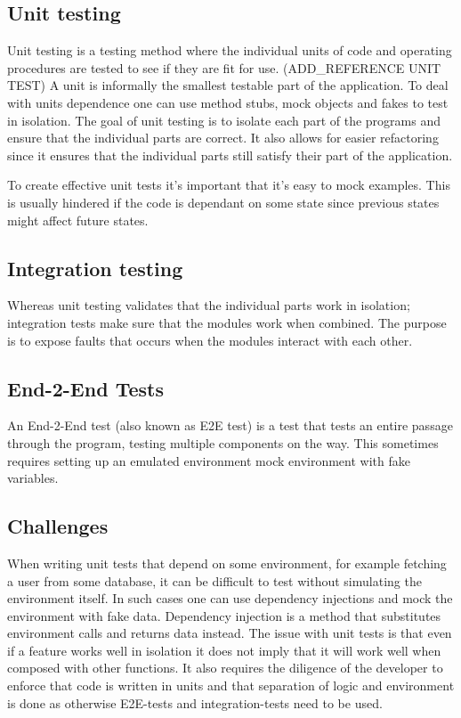 \subsection{Unit testing}

Unit testing is a testing method where the individual units of code and
operating procedures are tested to see if they are fit for use. (ADD\_REFERENCE
UNIT TEST) A unit is informally the smallest testable part of the application.
To deal with units dependence one can use method stubs, mock objects and fakes
to test in isolation. The goal of unit testing is to isolate each part of the
programs and ensure that the individual parts are correct. It also allows for
easier refactoring since it ensures that the individual parts still satisfy
their part of the application.

To create effective unit tests it's important that it's easy to mock examples.
This is usually hindered if the code is dependant on some state since previous
states might affect future states.

\subsection{Integration testing}

Whereas unit testing validates that the individual parts work in isolation;
integration tests make sure that the modules work when combined. The purpose is
to expose faults that occurs when the modules interact with each other.

\subsection{End-2-End Tests}

An End-2-End test (also known as E2E test) is a test that tests an entire
passage through the program, testing multiple components on the way. This
sometimes requires setting up an emulated environment mock environment with fake
variables.

\subsection{Challenges}\label{challenges}

When writing unit tests that depend on some environment, for example fetching a
user from some database, it can be difficult to test without simulating the
environment itself. In such cases one can use dependency injections and mock the
environment with fake data. Dependency injection is a method that substitutes
environment calls and returns data instead. The issue with unit tests is that
even if a feature works well in isolation it does not imply that it will work
well when composed with other functions. It also requires the diligence of the 
developer to enforce that code is written in units and that separation of logic and
environment is done as otherwise E2E-tests and integration-tests need to be used.

